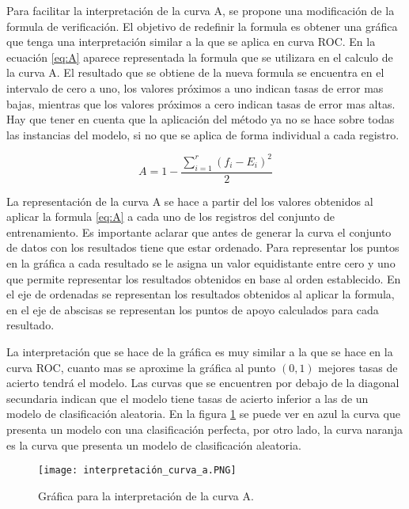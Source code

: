 \bigbreak

Para facilitar la interpretación de la curva A, se propone una modificación de la formula de verificación. El objetivo de redefinir la formula es obtener una gráfica que tenga una interpretación similar a la que se aplica en curva ROC. En la ecuación \ref{eq:A} aparece representada la formula que se utilizara en el calculo de la curva A. El resultado que se obtiene de la nueva formula se encuentra en el intervalo de cero a uno, los valores próximos a uno indican tasas de error mas bajas, mientras que los valores próximos a cero indican tasas de error mas altas. Hay que tener en cuenta que la aplicación del método ya no se hace sobre todas las instancias del modelo, si no que se aplica de forma individual a cada registro.

\bigbreak

\begin{equation}
    A = 1-\frac{\sum_{i=1}^{r}{(f_{i}-E_{i})^{2}}}{2}
    \label{eq:A}
\end{equation}

\bigbreak



La representación de la curva A se hace a partir del los valores obtenidos al aplicar la formula \ref{eq:A} a cada uno de los registros del conjunto de entrenamiento. Es importante aclarar que antes de generar la curva el conjunto de datos con los resultados tiene que estar ordenado. Para representar los puntos en la gráfica a cada resultado se le asigna un valor equidistante entre cero y uno que permite representar los resultados obtenidos en base al orden establecido. En el eje de ordenadas se representan los resultados obtenidos al aplicar la formula, en el eje de abscisas se representan los puntos de apoyo calculados para cada resultado.

\bigbreak

La interpretación que se hace de la gráfica es muy similar a la que se hace en la curva ROC, cuanto mas se aproxime la gráfica al punto $(0, 1)$ mejores tasas de acierto tendrá el modelo. Las curvas que se encuentren por debajo de la diagonal secundaria indican que el modelo tiene tasas de acierto inferior a las de un modelo de clasificación aleatoria. En la figura \ref{fig:1} se puede ver en azul la curva que presenta un modelo con una clasificación perfecta, por otro lado, la curva naranja es la curva que presenta un modelo de clasificación aleatoria.

\bigbreak

\begin{figure}[htp]
    \centering
    \texttt{[image: interpretación\_curva\_a.PNG]}
    \caption{Gráfica para la interpretación de la curva A.}
    \label{fig:1}
\end{figure}

